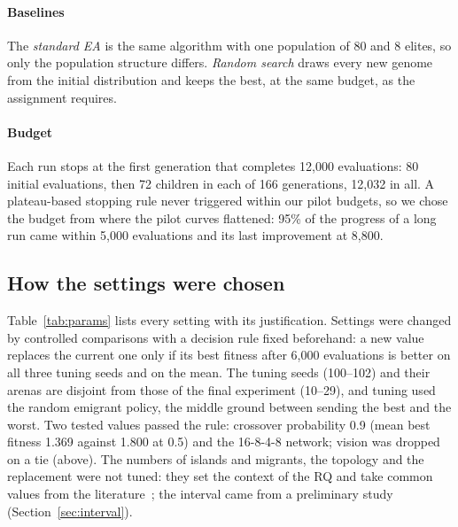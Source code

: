 \documentclass[sigconf]{acmart}
\begin{document}
\paragraph{Baselines} The \emph{standard EA} is the same algorithm with one
population of 80 and 8 elites, so only the population structure differs.
\emph{Random search} draws every new genome from the initial distribution and
keeps the best, at the same budget, as the assignment requires.

\paragraph{Budget} Each run stops at the first generation that completes
12{,}000 evaluations: 80 initial evaluations, then 72 children in each of 166
generations, 12{,}032 in all. A plateau-based stopping
rule never triggered within our pilot budgets, so we chose the budget from
where the pilot curves flattened: 95\% of the progress of a long run came
within 5{,}000 evaluations and its last improvement at 8{,}800.

\subsection{How the settings were chosen}
\label{sec:settings}

Table~\ref{tab:params} lists every setting with its justification. Settings
were changed by controlled comparisons with a decision rule fixed beforehand:
a new value replaces the current one only if its best fitness after 6{,}000
evaluations is better on all three tuning seeds and on the mean. The tuning
seeds (100--102) and their arenas are disjoint from those of the final
experiment (10--29), and tuning used the random emigrant policy, the middle
ground between sending the best and the worst. Two tested values passed the
rule: crossover probability 0.9 (mean best fitness 1.369 against 1.800 at 0.5)
and the 16-8-4-8 network; vision was dropped on a tie (above). The numbers of
islands and migrants, the topology and the replacement were not tuned: they set the
context of the RQ and take common values from the
literature~\cite{cantupaz2001migration}; the interval came from a
preliminary study (Section~\ref{sec:interval}).
\end{document}
